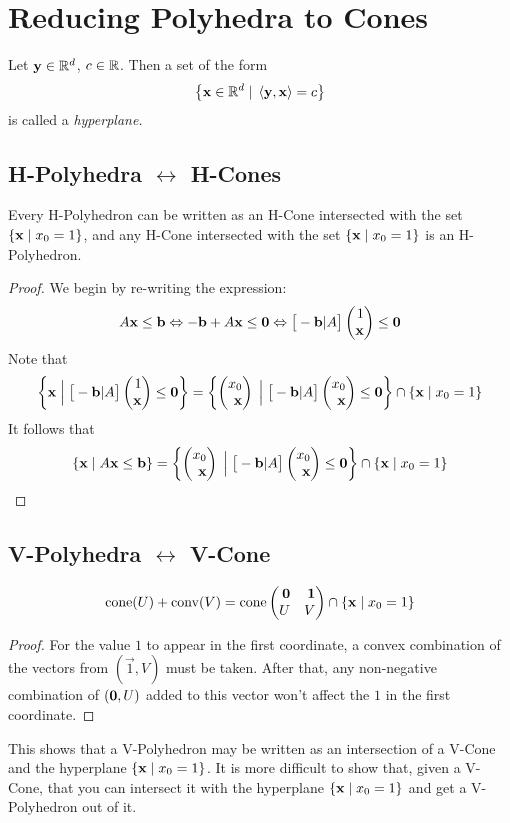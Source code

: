 \section{Reducing Polyhedra to Cones}

\begin{Def}[Hyperplane]
	Let $\mathbf{y} \in \mathbb{R}^d$, $c \in \mathbb{R}$.  Then a set of the form
	\[ \left\{\mathbf{x} \in \mathbb{R}^d \;|\; \left\langle \mathbf{y}, \mathbf{x} \right\rangle = c\right\} \]
	is called a \em{hyperplane}.
\end{Def}

\subsection{H-Polyhedra $\leftrightarrow$ H-Cones}

\newcommand{\hpxz}{\set{\x\st x_0 = 1}}
\begin{Prop}
	Every H-Polyhedron can be written as an H-Cone intersected with the set $\hpxz$, and any H-Cone intersected with the set $\hpxz$ is an H-Polyhedron.
\end{Prop}

\begin{proof}
	We begin by re-writing the expression:
	\[	A\x \leq \b \Leftrightarrow -\b + A\x \leq \0 \Leftrightarrow
		\big[-\b|A\big]\onex \leq \0 \]
	Note that
	\[\set{\x\St\big[-\b|A\big]\onex\leq\0} = \LHC \cap \hpxz \]
	It follows that
	\[ \HP{A}{\b} = \LHC \cap \hpxz \]
\end{proof}

\subsection{V-Polyhedra $\leftrightarrow$ V-Cone}

\begin{Prop}
	\[ \VP{U}{V} = \cone\pmb \0 & \1 \\ U & V \pme \cap \hpxz \]
\end{Prop}

\begin{proof}
	For the value $1$ to appear in the first coordinate, a convex combination of the vectors from $(\vec{1}, V)$ must be taken.  After that, any non-negative combination of $(\mathbf{0},U)$ added to this vector won't affect the $1$ in the first coordinate.
\end{proof}

This shows that a V-Polyhedron may be written as an intersection of a V-Cone and the hyperplane $\hpxz$.  It is more difficult to show that, given a V-Cone, that you can intersect it with the hyperplane $\hpxz$ and get a V-Polyhedron out of it.

